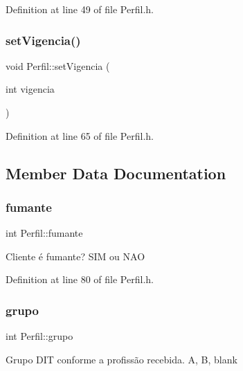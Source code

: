Definition at line 49 of file Perfil.\+h.

\hypertarget{class_perfil_aefc002d90218c1703a7cf26679480086}{}\label{class_perfil_aefc002d90218c1703a7cf26679480086} 
\subsubsection{\texorpdfstring{set\+Vigencia()}{setVigencia()}}
{\footnotesize\ttfamily void Perfil\+::set\+Vigencia (\begin{DoxyParamCaption}\item[{int}]{vigencia }\end{DoxyParamCaption})\hspace{0.3cm}{\ttfamily [inline]}}



Definition at line 65 of file Perfil.\+h.



\subsection{Member Data Documentation}
\hypertarget{class_perfil_a4ced26fed0c87e3fa425bc3d7e8cdc87}{}\label{class_perfil_a4ced26fed0c87e3fa425bc3d7e8cdc87} 
\subsubsection{\texorpdfstring{fumante}{fumante}}
{\footnotesize\ttfamily int Perfil\+::fumante\hspace{0.3cm}{\ttfamily [private]}}

Cliente é fumante? S\+IM ou N\+AO 

Definition at line 80 of file Perfil.\+h.

\hypertarget{class_perfil_ad6408bcf9e079be0f8d5df42c0d9a080}{}\label{class_perfil_ad6408bcf9e079be0f8d5df42c0d9a080} 
\subsubsection{\texorpdfstring{grupo}{grupo}}
{\footnotesize\ttfamily int Perfil\+::grupo\hspace{0.3cm}{\ttfamily [private]}}

Grupo D\+IT conforme a profissão recebida. A, B, blank 

